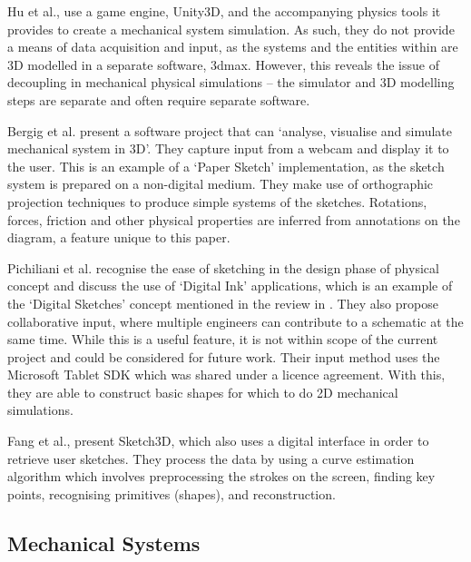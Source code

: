 \documentclass{article}
\begin{document}
Hu et al., \cite{6274802} use a game engine, Unity3D, and the accompanying physics tools it provides to create a 
mechanical system simulation. As such, they do not provide a means of data acquisition and input, as the systems
and the entities within are 3D modelled in a separate software, 3dmax. However, this reveals the issue of decoupling in
mechanical physical simulations -- the simulator and 3D modelling steps are separate and often require separate software.

Bergig et al. \cite{5336490} present a software project that can `analyse, visualise and simulate mechanical system in 3D'.
They capture input from a webcam and display it to the user. This is an example of a `Paper Sketch' implementation, as the 
sketch system is prepared on a non-digital medium. They make use of orthographic projection techniques to produce simple systems
of the sketches. Rotations, forces, friction and other physical properties are inferred from annotations on the diagram, a feature
unique to this paper.

Pichiliani et al. \cite{5460522} recognise the ease of sketching in the design phase of physical concept and discuss
the use of `Digital Ink' applications, which is an example of the `Digital Sketches' concept mentioned in the review in 
\cite{101017S}. They also propose collaborative input, where multiple engineers can contribute to a schematic at the same
time. While this is a useful feature, it is not within scope of the current project and could be considered for future 
work. Their input method uses the Microsoft Tablet \gls{SDK} which was shared under a licence agreement. With this, they
are able to construct basic shapes for which to do 2D mechanical simulations.

Fang et al., \cite{4722231} present Sketch3D, which also uses a digital interface in order to retrieve user sketches.
They process the data by using a curve estimation algorithm which involves preprocessing the strokes on the screen, finding
key points, recognising primitives (shapes), and reconstruction. 


\subsection{Mechanical Systems}
\label{subsec:Mechanical Systems}
\end{document}
